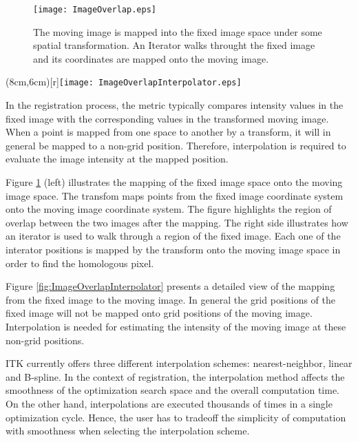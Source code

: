 % 
%

\begin{figure}
\center
\texttt{[image: ImageOverlap.eps]}
\caption{ The moving image is mapped into the fixed image space under some
spatial transformation. An Iterator walks throught the fixed image and its
coordinates are mapped onto the moving image.}
\label{fig:ImageOverlapIterator}
\end{figure}


\parpic(8cm,6cm)[r]{\texttt{[image: ImageOverlapInterpolator.eps]}}

In the registration process, the metric typically compares intensity values 
in the fixed image with the corresponding values in the transformed moving
image. When a point is mapped from one space to another by a transform,
it will in general be mapped to a non-grid position. Therefore, interpolation
is required to evaluate the image intensity at the mapped position.

Figure \ref{fig:ImageOverlapIterator} (left) illustrates the mapping of the
fixed image space onto the moving image space. The transfom maps points from
the fixed image coordinate system onto the moving image coordinate system. The
figure highlights the region of overlap between the two images after the
mapping. The right side illustrates how an iterator is used to walk through a
region of the fixed image. Each one of the interator positions is mapped by the
transform onto the moving image space in order to find the homologous pixel.

Figure \ref{fig:ImageOverlapInterpolator} presents a detailed view of the
mapping from the fixed image to the moving image. In general the grid positions
of the fixed image will not be mapped onto grid positions of the moving image.
Interpolation is needed for estimating the intensity of the moving image at
these non-grid positions.


ITK currently offers three different interpolation schemes: nearest-neighbor,
linear and B-spline. In the context of registration, the interpolation method
affects the smoothness of the optimization search space and the overall
computation time. On the other hand, interpolations are executed thousands of
times in a single optimization cycle. Hence, the user has to tradeoff the
simplicity of computation with smoothness when selecting the interpolation 
scheme.

